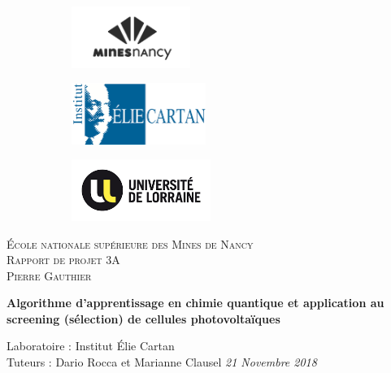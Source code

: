 \documentclass[a4paper,12pt,titlepage]{report}
\begin{document}
\begin{titlepage}
 
	\begin{center}
	\begin{figure}[!h]
	\centering	
		\begin{subfigure}[b]{0.3\textwidth}
		\includegraphics[height = 2cm, keepaspectratio]{graphes/mines_nancy.png}
		\end{subfigure}
		\begin{subfigure}[b]{0.3\textwidth}
		\includegraphics[height = 2cm, keepaspectratio]{graphes/elie_cartan.png}
		\end{subfigure}
		\begin{subfigure}[b]{0.3\textwidth}
		\includegraphics[height = 2cm, keepaspectratio]{graphes/univ_lorraine.png}
	\end{subfigure}
	\end{figure}
 
	\textsc{École nationale supérieure des Mines de Nancy}\\[2cm]
	\textsc{Rapport de projet 3A}\\[1cm]
	\textsc{Pierre Gauthier}\\[1cm]
 
	\begin{doublespace}
		{ \huge \bfseries{Algorithme d'apprentissage en chimie quantique et application au screening (sélection) de cellules photovoltaïques}}\\[2cm]
	\end{doublespace}
	\textmd{Laboratoire : Institut Élie Cartan}\\[1cm]
	\textmd{Tuteurs : Dario Rocca et Marianne Clausel}
	\vfill
	{\textit{{\large 21 Novembre 2018}}}
 
	\end{center}
\end{titlepage}
\end{document}
